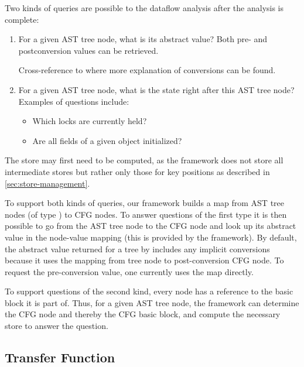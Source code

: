 Two kinds of queries are possible to the dataflow analysis after the analysis is complete:
\begin{enumerate}
    \item For a given AST tree node, what is its abstract value?  Both pre- and postconversion
    values can be retrieved.
\begin{workinprogress}
Cross-reference to where more explanation of conversions can be found.
\end{workinprogress}
    \item For a given AST tree node, what is the state right after this AST tree node?  Examples of questions
    include:
    \begin{itemize}
        \item Which locks are currently held?
        \item Are all fields of a given object initialized?
    \end{itemize}
\end{enumerate}

The store may first need to be computed, as the framework does not store all intermediate
stores but rather only those for key positions as described in \autoref{sec:store-management}.

To support both kinds of queries, our framework builds a map from AST tree nodes (of type
) to CFG nodes.  To answer questions of the first type it is
then possible to go from the AST tree node to the CFG node and look up its abstract value in
the node-value mapping (this is provided by the framework).  By default, the abstract value returned for a tree by  includes any implicit conversions because it uses the mapping
from tree node to post-conversion CFG node.  To request the pre-conversion value, one currently uses the  map directly.

To support questions of the second kind, every node has a reference
to the basic block it is part of. Thus, for a given AST tree node, the framework
can determine the CFG node and thereby the CFG basic block, and compute the necessary store
to answer the question.


\subsection{Transfer Function}
\label{sec:transfer-fnc}

